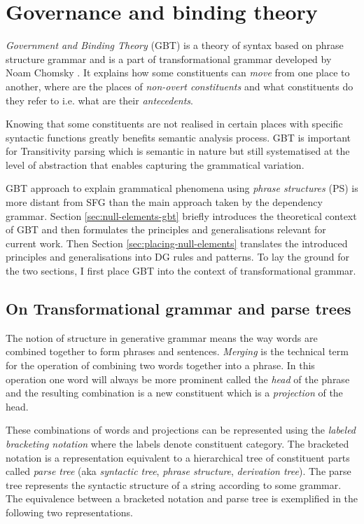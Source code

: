\chapter{Governance and binding theory}
\label{ch:gbt}

\textit{Government and Binding Theory} (GBT) is a theory of syntax based on phrase structure grammar and is a part of transformational grammar developed by Noam Chomsky \citeyearpar{Chomsky1981}.
It explains how some constituents can \textit{move} from one place to another, where are the places of \textit{non-overt constituents} and what constituents do they refer to i.e. what are their \textit{antecedents}. 

Knowing that some constituents are not realised in certain places with specific syntactic functions greatly benefits semantic analysis process. GBT is important for Transitivity parsing which is semantic in nature but still systematised at the level of abstraction that enables capturing the grammatical variation. 

GBT approach to explain grammatical phenomena using \textit{phrase structures} (PS) is more distant from SFG than the main approach taken by the dependency grammar. Section \ref{sec:null-elements-gbt} briefly introduces the theoretical context of GBT and then formulates the principles and generalisations relevant for current work. Then Section \ref{sec:placing-null-elements} translates the introduced principles and generalisations into DG rules and patterns. To lay the ground for the two sections, I first place GBT into the context of transformational grammar.

\section{On Transformational grammar and parse trees}

The notion of structure in generative grammar means the way words are combined together to form phrases and sentences. \textit{Merging} is the technical term for the operation of combining two words together into a phrase. In this operation one word will always be more prominent called the \textit{head} of the phrase and the resulting combination is a new constituent which is a \textit{projection} of the head. 

These combinations of words and projections can be represented using the \textit{labeled bracketing notation} where the labels denote constituent category. The bracketed notation is a representation equivalent to a hierarchical tree of constituent parts called \textit{parse tree} (aka \textit{syntactic tree}, \textit{phrase structure}, \textit{derivation tree}). The parse tree represents the syntactic structure of a string according to some grammar. The equivalence between a bracketed notation and parse tree is exemplified in the following two representations.

